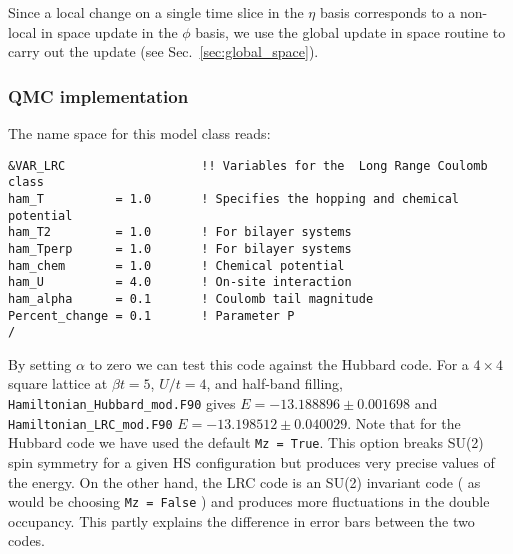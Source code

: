 Since a local change on  a single time slice in the $\eta$ basis corresponds to a non-local in space update  in the $\phi$ basis, we  use the global update in  space routine to carry out the update (see Sec.~\ref{sec:global_space}). 

\subsubsection*{ QMC implementation } 

The name space for this model class  reads: 

\begin{lstlisting}[style=fortran,escapechar=\#,breaklines=true]
&VAR_LRC                   !! Variables for the  Long Range Coulomb class
ham_T          = 1.0       ! Specifies the hopping and chemical potential
ham_T2         = 1.0       ! For bilayer systems
ham_Tperp      = 1.0       ! For bilayer systems
ham_chem       = 1.0       ! Chemical potential
ham_U          = 4.0       ! On-site interaction
ham_alpha      = 0.1       ! Coulomb tail magnitude
Percent_change = 0.1       ! Parameter P 
/
\end{lstlisting}

By setting $\alpha$ to zero we can test this code against the Hubbard code.   For a   $ 4 \times 4 $ square  lattice at $ \beta t = 5$, $U/t = 4$, and half-band filling,     \texttt{Hamiltonian\_Hubbard\_mod.F90}    gives $ E = -13.188896      \pm  0.001698 $  and
  \texttt{Hamiltonian\_LRC\_mod.F90}  $ E =  -13.198512    \pm  0.040029 $.    Note that for the  Hubbard code we have used  the default \texttt{Mz = True}.   This  option   breaks SU(2) spin symmetry for a given HS configuration but produces very precise values of the energy. On the other hand,  the LRC code  is an SU(2) invariant code ( as would be  choosing \texttt{Mz = False}  )  and  produces  more  fluctuations in the double occupancy.   This  partly explains the difference in  error  bars between the two codes. 
  



